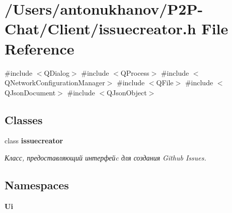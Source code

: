 \section{/\+Users/antonukhanov/\+P2\+P-\/\+Chat/\+Client/issuecreator.h File Reference}
\label{issuecreator_8h}
{\ttfamily \#include $<$Q\+Dialog$>$}\newline
{\ttfamily \#include $<$Q\+Process$>$}\newline
{\ttfamily \#include $<$Q\+Network\+Configuration\+Manager$>$}\newline
{\ttfamily \#include $<$Q\+File$>$}\newline
{\ttfamily \#include $<$Q\+Json\+Document$>$}\newline
{\ttfamily \#include $<$Q\+Json\+Object$>$}\newline
\subsection*{Classes}
\begin{DoxyCompactItemize}
\item 
class \textbf{ issuecreator}
\begin{DoxyCompactList}\small\item\em Класс, предоставляющий интерфейc для создания Github Issues. \end{DoxyCompactList}\end{DoxyCompactItemize}
\subsection*{Namespaces}
\begin{DoxyCompactItemize}
\item 
 \textbf{ Ui}
\end{DoxyCompactItemize}
